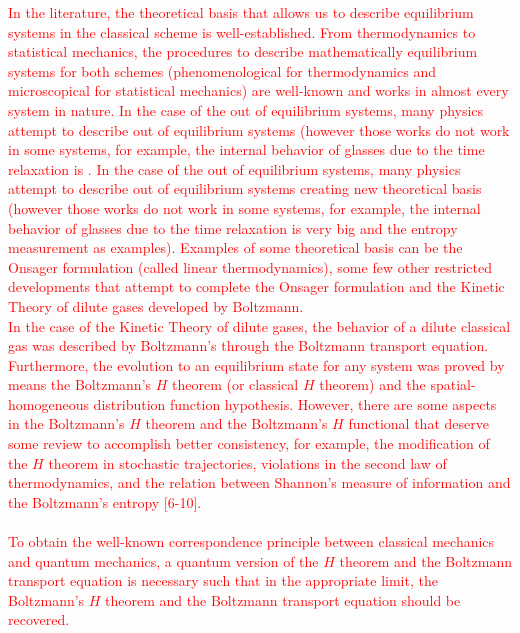 \documentclass{article}
\begin{document}
\textcolor{red}{In the literature, the theoretical basis that allows us to describe equilibrium systems in the classical scheme is well-established. From thermodynamics to statistical mechanics, the procedures to describe mathematically equilibrium systems for both schemes (phenomenological for thermodynamics and microscopical for statistical mechanics) are well-known and works in almost every system in nature. In the case of the out of equilibrium systems, many physics attempt to describe out of equilibrium systems (however those works do not work in some systems, for example, the internal behavior of glasses due to the time relaxation is  \cite{huang, reif, patrick}. In the case of the out of equilibrium systems, many physics attempt to describe out of equilibrium systems creating new theoretical basis (however those works do not work in some systems, for example, the internal behavior of glasses due to the time relaxation is very big \cite{cristal1} and the entropy measurement \cite{cristal2, cristal3} as examples). Examples of some theoretical basis can be the Onsager formulation (called linear thermodynamics), some few other restricted developments that attempt to complete the Onsager formulation \cite{kei, onsager} and the Kinetic Theory of dilute gases developed by Boltzmann.\\
In the case of the Kinetic Theory of dilute gases, the behavior of a dilute classical gas was described by Boltzmann's through the Boltzmann transport equation. Furthermore, the evolution to an equilibrium state for any system was proved by means the Boltzmann's $H$ theorem (or classical $H$ theorem) and the spatial-homogeneous distribution function hypothesis.
However, there are some aspects in the Boltzmann's $H$ theorem and the Boltzmann's $H$ functional that deserve some review to accomplish better consistency, for example, the modification of the $H$ theorem in stochastic trajectories, violations in the second law of thermodynamics, and the relation between Shannon's measure of information and the Boltzmann's entropy  [6-10].\\ %
\\
To obtain the well-known correspondence principle between classical mechanics and quantum mechanics, a quantum version of the $H$ theorem and the Boltzmann transport equation is necessary such that in the appropriate limit, the  Boltzmann's $H$ theorem and the Boltzmann transport equation should be recovered.\\
}
\end{document}
